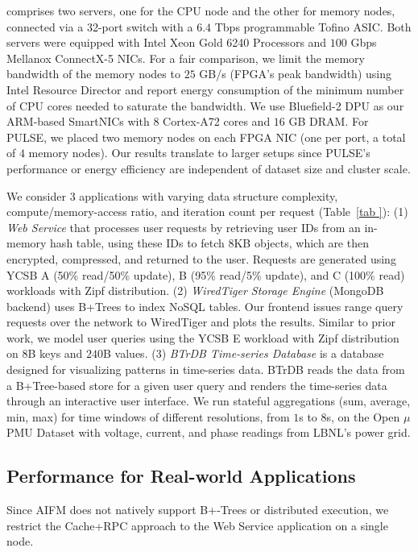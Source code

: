  comprises two servers, one for the CPU node and the other for memory nodes, connected via a 32-port switch with a $6.4$ Tbps programmable Tofino ASIC. Both servers were equipped with Intel Xeon Gold 6240 Processors and $100$ Gbps Mellanox ConnectX-5 NICs. For a fair comparison, we limit the memory bandwidth of the memory nodes to $25$ GB/s (FPGA's peak bandwidth) using Intel Resource Director and report energy consumption of the minimum number of CPU cores needed to saturate the bandwidth. We use Bluefield-2 DPU as our ARM-based SmartNICs with $8$ Cortex-A72 cores and $16$ GB DRAM. For PULSE, we placed two memory nodes on each FPGA NIC (one per port, a total of $4$ memory nodes). Our results translate to larger setups since PULSE's performance or energy efficiency are independent of dataset size and cluster scale.


 We consider $3$ applications with varying data structure complexity, compute/memory-access ratio, and iteration count per request (Table~\ref{tab
}): (1) \textit{Web Service} that processes user requests by retrieving user IDs from an in-memory hash table, using these IDs to fetch 8KB objects, which are then encrypted, compressed, and returned to the user. Requests are generated using YCSB A (50\% read/50\% update), B (95\% read/5\% update), and C (100\% read) workloads with Zipf distribution. (2) \textit{WiredTiger Storage Engine} (MongoDB backend) uses B+Trees to index NoSQL tables. Our frontend issues range query requests over the network to WiredTiger and plots the results. Similar to prior work, we model user queries using the YCSB E workload with Zipf distribution on $8$B keys and $240$B values. (3) \textit{BTrDB Time-series Database} is a database designed for visualizing patterns in time-series data. BTrDB reads the data from a B+Tree-based store for a given user query and renders the time-series data through an interactive user interface. We run stateful aggregations (sum, average, min, max) for time windows of different resolutions, from $1$s to $8$s, on the Open $\mu$PMU Dataset with voltage, current, and phase readings from LBNL’s power grid.

\subsection{Performance for Real-world Applications}

Since AIFM does not natively support B+-Trees or distributed execution, we restrict the Cache+RPC approach to the Web Service application on a single node.

